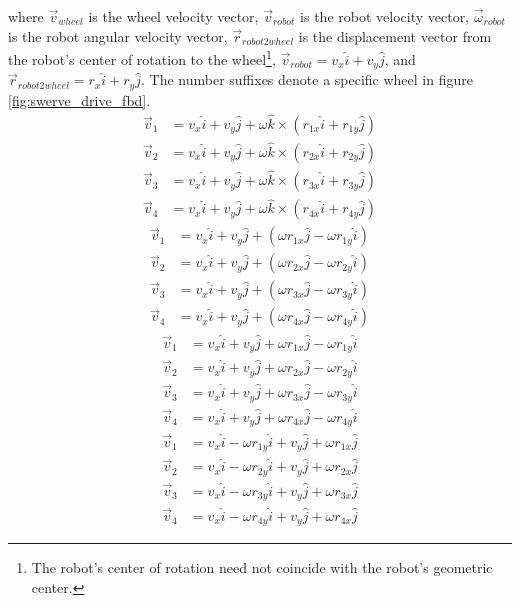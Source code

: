 where $\vec{v}_{wheel}$ is the wheel velocity vector, $\vec{v}_{robot}$ is the
robot velocity vector, $\vec{\omega}_{robot}$ is the robot angular velocity
vector, $\vec{r}_{robot2wheel}$ is the displacement vector from the robot's
center of rotation to the wheel\footnote{The robot's center of rotation need not
coincide with the robot's geometric center.},
$\vec{v}_{robot} = v_x \hat{i} + v_y \hat{j}$, and
$\vec{r}_{robot2wheel} = r_x \hat{i} + r_y \hat{j}$. The number suffixes denote
a specific wheel in figure \ref{fig:swerve_drive_fbd}.
\begin{align*}
  \vec{v}_1 &= v_x \hat{i} + v_y \hat{j} + \omega \hat{k} \times
    (r_{1x} \hat{i} + r_{1y} \hat{j}) \\
  \vec{v}_2 &= v_x \hat{i} + v_y \hat{j} + \omega \hat{k} \times
    (r_{2x} \hat{i} + r_{2y} \hat{j}) \\
  \vec{v}_3 &= v_x \hat{i} + v_y \hat{j} + \omega \hat{k} \times
    (r_{3x} \hat{i} + r_{3y} \hat{j}) \\
  \vec{v}_4 &= v_x \hat{i} + v_y \hat{j} + \omega \hat{k} \times
    (r_{4x} \hat{i} + r_{4y} \hat{j})
\end{align*}
\begin{align*}
  \vec{v}_1 &= v_x \hat{i} + v_y \hat{j} +
    (\omega r_{1x} \hat{j} - \omega r_{1y} \hat{i}) \\
  \vec{v}_2 &= v_x \hat{i} + v_y \hat{j} +
    (\omega r_{2x} \hat{j} - \omega r_{2y} \hat{i}) \\
  \vec{v}_3 &= v_x \hat{i} + v_y \hat{j} +
    (\omega r_{3x} \hat{j} - \omega r_{3y} \hat{i}) \\
  \vec{v}_4 &= v_x \hat{i} + v_y \hat{j} +
    (\omega r_{4x} \hat{j} - \omega r_{4y} \hat{i})
\end{align*}
\begin{align*}
  \vec{v}_1 &= v_x \hat{i} + v_y \hat{j} +
    \omega r_{1x} \hat{j} - \omega r_{1y} \hat{i} \\
  \vec{v}_2 &= v_x \hat{i} + v_y \hat{j} +
    \omega r_{2x} \hat{j} - \omega r_{2y} \hat{i} \\
  \vec{v}_3 &= v_x \hat{i} + v_y \hat{j} +
    \omega r_{3x} \hat{j} - \omega r_{3y} \hat{i} \\
  \vec{v}_4 &= v_x \hat{i} + v_y \hat{j} +
    \omega r_{4x} \hat{j} - \omega r_{4y} \hat{i}
\end{align*}
\begin{align*}
  \vec{v}_1 &= v_x \hat{i} - \omega r_{1y} \hat{i} +
    v_y \hat{j} + \omega r_{1x} \hat{j} \\
  \vec{v}_2 &= v_x \hat{i} - \omega r_{2y} \hat{i} +
    v_y \hat{j} + \omega r_{2x} \hat{j} \\
  \vec{v}_3 &= v_x \hat{i} - \omega r_{3y} \hat{i} +
    v_y \hat{j} + \omega r_{3x} \hat{j} \\
  \vec{v}_4 &= v_x \hat{i} - \omega r_{4y} \hat{i} +
    v_y \hat{j} + \omega r_{4x} \hat{j}
\end{align*}
